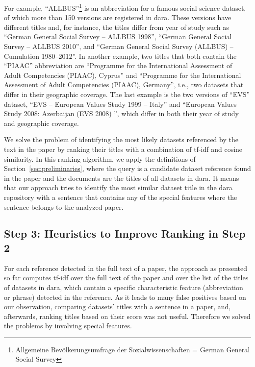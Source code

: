 \documentclass{IOS-Book-Article}
\newcommand{\dara}{\textsf{da\textbar ra}}
\begin{document}
For example, \enquote{ALLBUS}\footnote{Allgemeine Bev\"olkerungsumfrage der Sozialwissenschaften = German General Social Survey} is an abbreviation for a famous social science dataset, of which more than 150 versions are registered in {\dara}. These versions have different titles and, for instance, the titles differ from year of study such as \enquote{German General
Social Survey -- ALLBUS 1998}, \enquote{German General Social Survey -- ALLBUS 2010}, and \enquote{German General Social Survey (ALLBUS) -- Cumulation 1980--2012}.
In another example, two titles that both contain the \enquote{PIAAC} abbreviation are \enquote{Programme for the International Assessment of Adult Competencies (PIAAC), Cyprus} and \enquote{Programme for the International Assessment of Adult Competencies (PIAAC), Germany}, i.e., two datasets that differ in their geographic coverage. The last example is the two versions of \enquote{EVS} dataset, \enquote{EVS -- European Values Study 1999 -- Italy} and \enquote{European Values Study 2008: Azerbaijan (EVS 2008) }, which differ in both their year of study and geographic coverage.

We solve the problem of identifying the most likely datasets referenced by the text in the paper by ranking their titles with a combination of tf-idf and cosine similarity. In this ranking algorithm, we apply the definitions of Section~\ref{sec:preliminaries}, where the query is a candidate dataset reference found in the paper and the documents are the titles of all datasets in {\dara}. It means that our approach tries to identify the most similar dataset title in the {\dara} repository with a sentence that contains any of the special features where the sentence belongs to the analyzed paper.

\subsection{Step 3: Heuristics to Improve Ranking in Step 2}
\label{sec:heur-impr-rank}

For each reference detected in the full text of a paper, the approach as presented so far computes tf-idf over the full text of the paper and over the list of the titles of datasets in {\dara}, which contain a specific characteristic feature (abbreviation or phrase) detected in the reference. As it leads to many false positives based on our observation, comparing datasets' titles with a sentence in a paper, and, afterwards, ranking titles based on their score was not useful. Therefore we solved the problems by involving special features.
\end{document}
